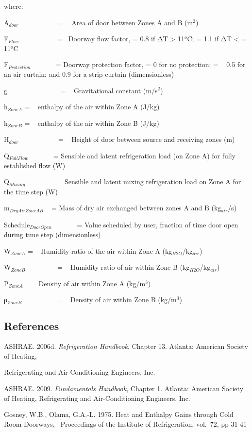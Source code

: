 where:

A\(_{door}\)~~~~~~~~~~~ = ~ Area of door between Zones A and B (m\(^{2}\))

F\(_{Flow}\) ~~~~~~~~~~ = ~Doorway flow factor, = 0.8 if ΔT \textgreater{} 11\(^{o}\)C; = 1.1 if ΔT \textless{} = 11\(^{o}\)C

F\(_{Protection}\) ~~~~~~ = Doorway protection factor, = 0 for no protection; = ~ 0.5 for an air curtain; and 0.9 for a strip curtain (dimensionless)

g~~~~~~~~~~~~~~~ = ~ Gravitational constant (m/s\(^{2}\))

h\(_{ZoneA}\) = ~ enthalpy of the air within Zone A (J/kg)

h\(_{ZoneB}\) = ~ enthalpy of the air within Zone B (J/kg)

H\(_{door}\)~~~~~~~~~~~ = ~ Height of door between source and receiving zones (m)

Q\(_{FullFlow}\) ~~~~~~ = Sensible and latent refrigeration load (on Zone A) for fully established flow (W)

Q\(_{Mixing}\) ~~~~~~~~ = Sensible and latent mixing refrigeration load on Zone A for the time step (W)

m\(_{DryAirZoneAB}\) ~ = Mass of dry air exchanged between zones A and B (kg\(_{air}\)/s)

Schedule\(_{DoorOpen}\) ~~~~~~ = Value scheduled by user, fraction of time door open during time step (dimensionless)

W\(_{ZoneA}\) = ~ Humidity ratio of the air within Zone A (kg\(_{H2O}\)/kg\(_{air}\))

W\(_{ZoneB}\) ~~~~~~~~ = ~ Humidity ratio of air within Zone B (kg\(_{H2O}\)/kg\(_{air}\))

Ρ\(_{ZoneA}\) = ~ Density of air within Zone A (kg/m\(^{3}\))

ρ\(_{ZoneB}\) ~~~~~~~~~ = ~ Density of air within Zone B (kg/m\(^{3}\))

\subsection{References}\label{references}

ASHRAE. 2006d. \emph{Refrigeration Handbook}, Chapter 13. Atlanta: American Society of Heating,

Refrigerating and Air-Conditioning Engineers, Inc.

ASHRAE. 2009. \emph{Fundamentals Handbook}, Chapter 1. Atlanta: American Society of Heating, Refrigerating and Air-Conditioning Engineers, Inc.

Gosney, W.B., Olama, G.A.-L. 1975. Heat and Enthalpy Gains through Cold Room Doorways,~ Proceedings of the Institute of Refrigeration, vol.~72, pp 31-41
